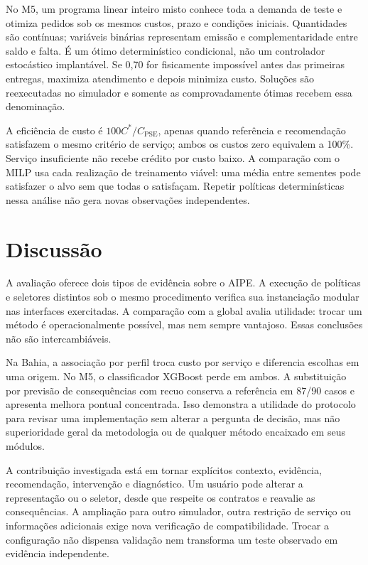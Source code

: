 \documentclass[preprint,12pt]{elsarticle}
\begin{document}
No M5, um programa linear inteiro misto conhece toda a demanda de teste e otimiza pedidos sob os mesmos custos, prazo e condições iniciais. Quantidades são contínuas; variáveis binárias representam emissão e complementaridade entre saldo e falta. É um ótimo determinístico condicional, não um controlador estocástico implantável. Se 0,70 for fisicamente impossível antes das primeiras entregas, maximiza atendimento e depois minimiza custo. Soluções são reexecutadas no simulador e somente as comprovadamente ótimas recebem essa denominação.

A eficiência de custo é $100C^*/C_{\mathrm{PSE}}$, apenas quando referência e recomendação satisfazem o mesmo critério de serviço; ambos os custos zero equivalem a 100\%. Serviço insuficiente não recebe crédito por custo baixo. A comparação com o MILP usa cada realização de treinamento viável: uma média entre sementes pode satisfazer o alvo sem que todas o satisfaçam. Repetir políticas determinísticas nessa análise não gera novas observações independentes.





\section{Discussão}
A avaliação oferece dois tipos de evidência sobre o AIPE. A execução de políticas e seletores distintos sob o mesmo procedimento verifica sua instanciação modular nas interfaces exercitadas. A comparação com a global avalia utilidade: trocar um método é operacionalmente possível, mas nem sempre vantajoso. Essas conclusões não são intercambiáveis.

Na Bahia, a associação por perfil troca custo por serviço e diferencia escolhas em uma origem. No M5, o classificador XGBoost perde em ambos. A substituição por previsão de consequências com recuo conserva a referência em 87/90 casos e apresenta melhora pontual concentrada. Isso demonstra a utilidade do protocolo para revisar uma implementação sem alterar a pergunta de decisão, mas não superioridade geral da metodologia ou de qualquer método encaixado em seus módulos.

A contribuição investigada está em tornar explícitos contexto, evidência, recomendação, intervenção e diagnóstico. Um usuário pode alterar a representação ou o seletor, desde que respeite os contratos e reavalie as consequências. A ampliação para outro simulador, outra restrição de serviço ou informações adicionais exige nova verificação de compatibilidade. Trocar a configuração não dispensa validação nem transforma um teste observado em evidência independente.
\end{document}
